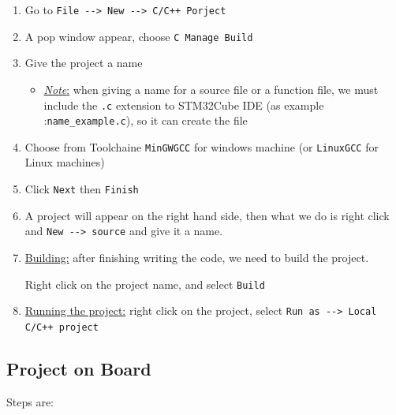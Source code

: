 \begin{enumerate}

    \item Go to \verb|File --> New --> C/C++ Porject|
    
    \item A pop window appear, choose \verb|C Manage Build|
    
    \item Give the project a name
    
    \begin{itemize}
        \item \underline{\textit{Note}:} when giving a name for a source file or a function file, we must include the \verb|.c| extension to STM32Cube IDE (as example :\verb|name_example.c|), so it can create the file
    \end{itemize}
    
    \item Choose from Toolchaine \verb|MinGWGCC| for windows machine (or \verb|LinuxGCC| for Linux machines)
    
    \item Click \verb|Next| then \verb|Finish|
    
    \item A project will appear on the right hand side, then what we do is right click and \verb|New --> source| and give it a name.
    
    \item \underline{Building:} after finishing writing the code, we need to build the project.
    
    Right click on the project name, and select \verb|Build|
    
    \item \underline{Running the project:} right click on the project, select \verb|Run as --> Local C/C++ project|
    
    
\end{enumerate}

\newpage
\subsection{Project on Board}
\label{Sub:Project on Board}

Steps are:

